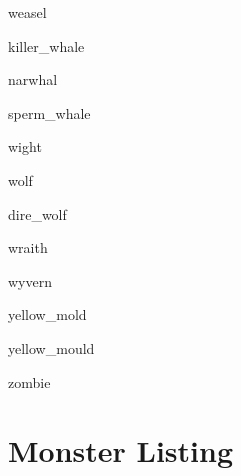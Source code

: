 \documentclass[letterpaper,serif]{module}
\begin{document}
\begin{newmonster}{weasel}\end{newmonster}


\begin{newmonster}{killer_whale}\end{newmonster}

\begin{newmonster}{narwhal}\end{newmonster}

\begin{newmonster}{sperm_whale}\end{newmonster}

\begin{newmonster}{wight}\end{newmonster}


\begin{newmonster}{wolf}\end{newmonster}

\begin{newmonster}{dire_wolf}\end{newmonster}

\begin{newmonster}{wraith}\end{newmonster}

\begin{newmonster}{wyvern}\end{newmonster}

\begin{newmonster}{yellow_mold}\end{newmonster}

\begin{newmonster}{yellow_mould}\end{newmonster}

\begin{newmonster}{zombie}\end{newmonster}

\onecolumn

\section*{Monster Listing}
\label{wanderingmonsters}

\begin{wanderingmonsters}
\end{wanderingmonsters}

\twocolumn

\tableofcontents
\end{document}
